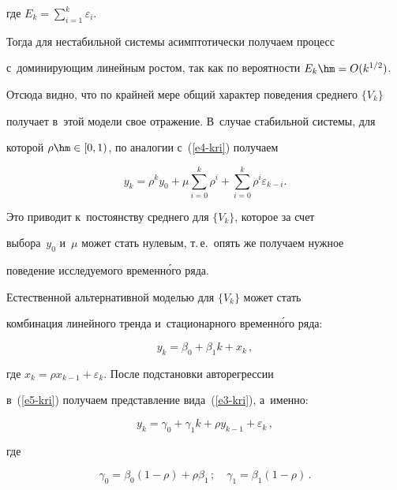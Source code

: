 где $E_k=\sum\nolimits^k_{i=1} \varepsilon_i$.


Тогда для нестабильной системы асимп\-то\-ти\-че\-ски получаем процесс 


с~до\-ми\-ни\-ру\-ющим линейным рос\-том, так как  по ве\-ро\-ят\-ности $E_k\hm= O(k^{1/2})$. 


Отсюда видно, что по крайней мере общий характер поведения сред\-не\-го $\{V_k\}$ 


получает в~этой модели свое отражение. В~случае стабильной сис\-те\-мы, для 


которой $\rho\hm\in [0,1)$, по аналогии с~(\ref{e4-kri}) получаем


$$


y_k= \rho^k y_0 +\mu \sum\limits^k_{i=0} \rho^i +\sum\limits^k_{i=0} \rho^i 


\varepsilon_{k-i}.


$$


Это приводит к~постоянству среднего для $\{V_k\}$, которое за счет 


выбора~$y_0$ и~$\mu$ может стать нулевым, т.\,е.\ опять же получаем нуж\-ное 


поведение исследуемого временн\'{о}го ряда. 





     Естественной альтернативной моделью для $\{V_k\}$ может стать 


комбинация линейного тренда и~стационарного временн\'{о}го ряда:


     \begin{equation}


     y_k= \beta_0 +\beta_1  k +x_k\,,


     \label{e5-kri}


     \end{equation}


где $x_k= \rho x_{k-1} +\varepsilon_k$. После подстановки авторегрессии 


в~(\ref{e5-kri}) получаем пред\-став\-ле\-ние вида~(\ref{e3-kri}), а~именно:


$$


y_k= \gamma_0 + \gamma_1 k +\rho y_{k-1} +\varepsilon_k\,,


$$


     где 


     $$


     \gamma_0= \beta_0(1-\rho)+\rho \beta_1\,;\quad \gamma_1= \beta_1(1-\rho)\,.


     $$


